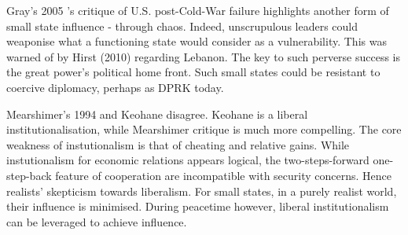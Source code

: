 Gray's 2005 \nocite{GRAY_2005}'s critique of U.S. post-Cold-War failure highlights another form of small state influence - through chaos. Indeed, unscrupulous leaders could weaponise what a functioning state would consider as a vulnerability. This was warned of by Hirst (2010) \nocite{HIRST_2010} regarding Lebanon. The key to such perverse success is the great power's political home front. Such small states could be resistant to coercive diplomacy, perhaps as DPRK today.

Mearshimer's 1994 \nocite{MEARSHIMER_1994} and Keohane \nocite{KEOHANE_1969} disagree. Keohane is a liberal institutionalisation, while Mearshimer critique is much more compelling. The core weakness of instutionalism is that of cheating and relative gains. While instutionalism for economic relations appears logical, the two-steps-forward one-step-back feature of cooperation are incompatible with security concerns. Hence realists' skepticism towards liberalism. For small states, in a purely realist world, their influence is minimised. During peacetime however, liberal institutionalism can be leveraged to achieve influence. 



